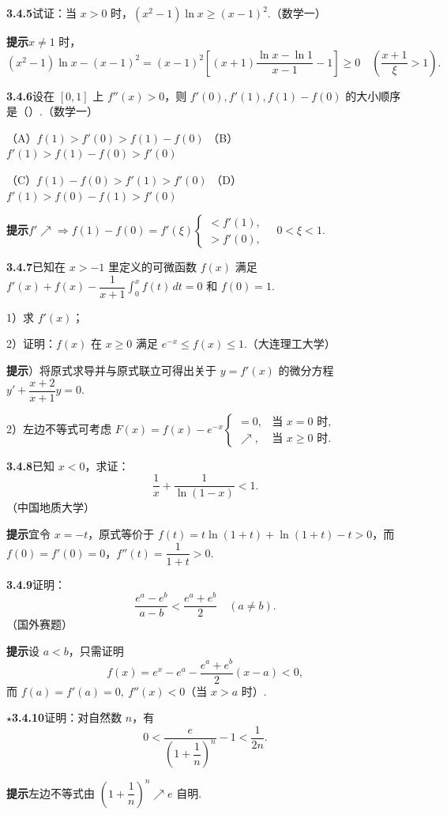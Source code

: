 \documentclass[UTF8,12pt,a4paper,fontset=fandol]{ctexart}
\begin{document}
\noindent\textbf{3.4.5}\quad 试证：当 $x>0$ 时，$(x^2-1)\ln x\ge(x-1)^2$.（数学一）

\noindent\textbf{提示}\quad $x\ne1$ 时，
\[
  (x^2-1)\ln x-(x-1)^2
  =(x-1)^2\left[(x+1)\frac{\ln x-\ln1}{x-1}-1\right]\ge0
  \quad\left(\frac{x+1}{\xi}>1\right).
\]

\noindent\textbf{3.4.6}\quad 设在 $[0,1]$ 上 $f''(x)>0$，则 $f'(0),f'(1),f(1)-f(0)$ 的大小顺序是（\quad）.（数学一）

（A）$f(1)>f'(0)>f(1)-f(0)$ \qquad
（B）$f'(1)>f(1)-f(0)>f'(0)$

（C）$f(1)-f(0)>f'(1)>f'(0)$ \qquad
（D）$f'(1)>f(0)-f(1)>f'(0)$

\noindent\textbf{提示}\quad $f'\nearrow\Rightarrow f(1)-f(0)=f'(\xi)
\begin{cases}
<f'(1),\\
>f'(0),
\end{cases}\quad0<\xi<1.$

\noindent\textbf{3.4.7}\quad 已知在 $x>-1$ 里定义的可微函数 $f(x)$ 满足 $f'(x)+f(x)-\dfrac1{x+1}\int_0^x f(t)\,dt=0$ 和 $f(0)=1$.

1）求 $f'(x)$；

2）证明：$f(x)$ 在 $x\ge0$ 满足 $e^{-x}\le f(x)\le1$.（大连理工大学）

\noindent\textbf{提示}）将原式求导并与原式联立可得出关于 $y=f'(x)$ 的微分方程 $y'+\dfrac{x+2}{x+1}y=0$.

2）左边不等式可考虑 $F(x)=f(x)-e^{-x}
\begin{cases}
=0, & \text{当 }x=0\text{ 时},\\
\nearrow, & \text{当 }x\ge0\text{ 时}.
\end{cases}$

\noindent\textbf{3.4.8}\quad 已知 $x<0$，求证：
\[
  \frac1x+\frac1{\ln(1-x)}<1.
\]
（中国地质大学）

\noindent\textbf{提示}\quad 宜令 $x=-t$，原式等价于 $f(t)=t\ln(1+t)+\ln(1+t)-t>0$，而 $f(0)=f'(0)=0$，$f''(t)=\dfrac1{1+t}>0$.

\noindent\textbf{3.4.9}\quad 证明：
\[
  \frac{e^a-e^b}{a-b}<\frac{e^a+e^b}2\quad(a\ne b).
\]
（国外赛题）

\noindent\textbf{提示}\quad 设 $a<b$，只需证明
\[
  f(x)=e^x-e^a-\frac{e^a+e^b}2(x-a)<0,
\]
而 $f(a)=f'(a)=0,\ f''(x)<0$（当 $x>a$ 时）.

\noindent\textbf{$\star$3.4.10}\quad 证明：对自然数 $n$，有
\[
  0<\frac{e}{\left(1+\dfrac1n\right)^n}-1<\frac1{2n}.
\]

\noindent\textbf{提示}\quad 左边不等式由 $\left(1+\dfrac1n\right)^n\nearrow e$ 自明.
\end{document}
